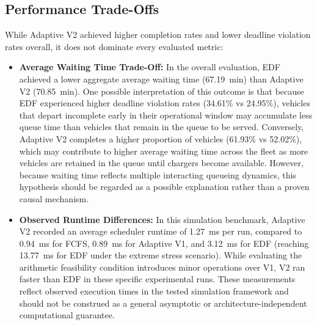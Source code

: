\documentclass[conference]{IEEEtran}
\begin{document}
\subsection{Performance Trade-Offs}
While Adaptive V2 achieved higher completion rates and lower deadline violation rates overall, it does not dominate every evaluated metric:
\begin{itemize}
    \item \textbf{Average Waiting Time Trade-Off:} In the overall evaluation, EDF achieved a lower aggregate average waiting time (67.19~min) than Adaptive V2 (70.85~min). One possible interpretation of this outcome is that because EDF experienced higher deadline violation rates (34.61\% vs 24.95\%), vehicles that depart incomplete early in their operational window may accumulate less queue time than vehicles that remain in the queue to be served. Conversely, Adaptive V2 completes a higher proportion of vehicles (61.93\% vs 52.02\%), which may contribute to higher average waiting time across the fleet as more vehicles are retained in the queue until chargers become available. However, because waiting time reflects multiple interacting queueing dynamics, this hypothesis should be regarded as a possible explanation rather than a proven causal mechanism.
    \item \textbf{Observed Runtime Differences:} In this simulation benchmark, Adaptive V2 recorded an average scheduler runtime of 1.27~ms per run, compared to 0.94~ms for FCFS, 0.89~ms for Adaptive V1, and 3.12~ms for EDF (reaching 13.77~ms for EDF under the extreme stress scenario). While evaluating the arithmetic feasibility condition introduces minor operations over V1, V2 ran faster than EDF in these specific experimental runs. These measurements reflect observed execution times in the tested simulation framework and should not be construed as a general asymptotic or architecture-independent computational guarantee.
\end{itemize}
\end{document}
